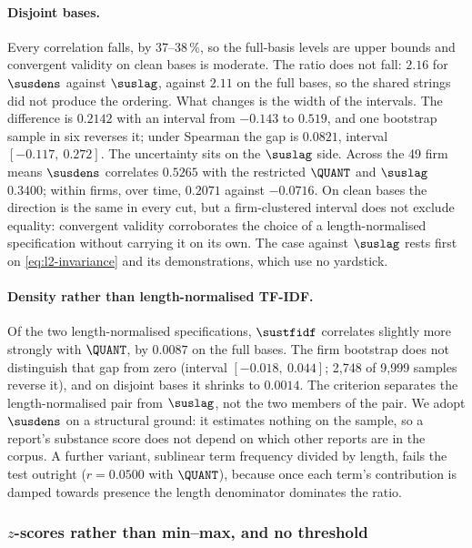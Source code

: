 \paragraph{Disjoint bases.}
\label{sec:validity-disjoint}
Every correlation falls, by 37--38\,\%, so the full-basis levels are upper
bounds and convergent validity on clean bases is moderate. The ratio does not
fall: $2.16$ for $\susdens$ against $\suslag$, against $2.11$ on the full
bases, so the shared strings did not produce the ordering. What changes is
the width of the intervals. The difference is $0.2142$ with an interval from $-0.143$ to
$0.519$, and one bootstrap sample in six reverses it; under Spearman the gap
is $0.0821$, interval $[-0.117,\ 0.272]$. The uncertainty sits on the
$\suslag$ side. Across the 49 firm means $\susdens$ correlates $0.5265$ with
the restricted $\QUANT$ and $\suslag$ $0.3400$; within firms, over time,
$0.2071$ against $-0.0716$. On clean bases the direction is the same in every
cut, but a firm-clustered interval does not exclude equality: convergent
validity corroborates the choice of a length-normalised specification without
carrying it on its own. The case against $\suslag$ rests first on
\eqref{eq:l2-invariance} and its demonstrations, which use no yardstick.

\paragraph{Density rather than length-normalised TF-IDF.}
\label{sec:validity-adopted}
Of the two length-normalised specifications, $\sustfidf$ correlates slightly
more strongly with $\QUANT$, by $0.0087$ on the full bases. The firm bootstrap does not distinguish that
gap from zero (interval $[-0.018,\ 0.044]$; 2{,}748 of 9{,}999 samples reverse
it), and on disjoint bases it shrinks to $0.0014$. The criterion separates the
length-normalised pair from $\suslag$, not the two members of the pair. We
adopt $\susdens$ on a structural ground: it estimates nothing on the sample, so
a report's substance score does not depend on which other reports are in the
corpus. A further variant, sublinear term frequency divided by length, fails
the test outright ($r = 0.0500$ with $\QUANT$), because once each term's
contribution is damped towards presence the length denominator dominates the
ratio.

\subsubsection{\texorpdfstring{$z$}{z}-scores rather than min--max, and no threshold}
\label{sec:artefact}

